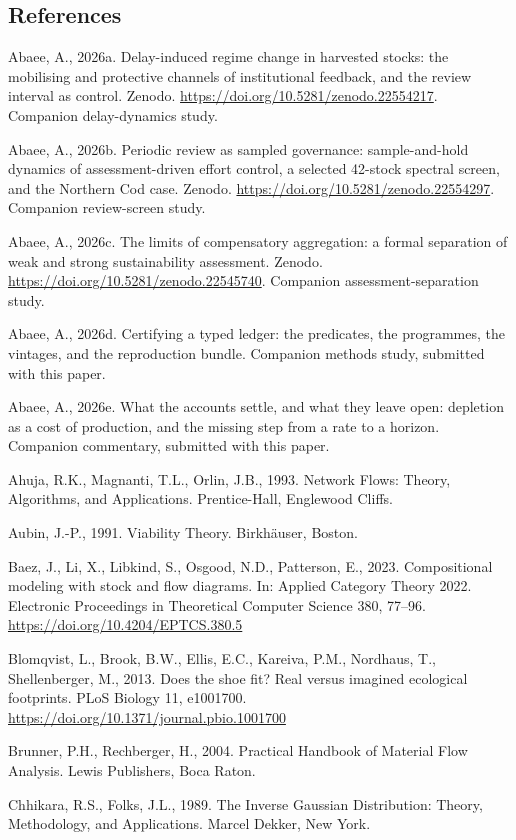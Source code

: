 \documentclass[11pt]{article}
\begin{document}
\subsection{References}\label{references}

Abaee, A., 2026a. Delay-induced regime change in harvested stocks: the
mobilising and protective channels of institutional feedback, and the
review interval as control. Zenodo.
\url{https://doi.org/10.5281/zenodo.22554217}. Companion delay-dynamics study.

Abaee, A., 2026b. Periodic review as sampled governance: sample-and-hold
dynamics of assessment-driven effort control, a selected 42-stock
spectral screen, and the Northern Cod case. Zenodo.
\url{https://doi.org/10.5281/zenodo.22554297}. Companion review-screen study.

Abaee, A., 2026c. The limits of compensatory aggregation: a formal separation of weak and strong sustainability assessment. Zenodo. \url{https://doi.org/10.5281/zenodo.22545740}. Companion assessment-separation study.

Abaee, A., 2026d. Certifying a typed ledger: the predicates, the programmes, the vintages, and the reproduction bundle. Companion methods study, submitted with this paper.

Abaee, A., 2026e. What the accounts settle, and what they leave open: depletion as a cost of production, and the missing step from a rate to a horizon. Companion commentary, submitted with this paper.

Ahuja, R.K., Magnanti, T.L., Orlin, J.B., 1993. Network Flows: Theory, Algorithms, and Applications. Prentice-Hall, Englewood Cliffs.

Aubin, J.-P., 1991. Viability Theory. Birkh\"auser, Boston.

Baez, J., Li, X., Libkind, S., Osgood, N.D., Patterson, E., 2023. Compositional modeling with stock and flow diagrams. In: Applied Category Theory 2022. Electronic Proceedings in Theoretical Computer Science 380, 77--96. \url{https://doi.org/10.4204/EPTCS.380.5}

Blomqvist, L., Brook, B.W., Ellis, E.C., Kareiva, P.M., Nordhaus, T.,
Shellenberger, M., 2013. Does the shoe fit? Real versus imagined
ecological footprints. PLoS Biology 11, e1001700.
\url{https://doi.org/10.1371/journal.pbio.1001700}

Brunner, P.H., Rechberger, H., 2004. Practical Handbook of Material Flow
Analysis. Lewis Publishers, Boca Raton.

Chhikara, R.S., Folks, J.L., 1989. The Inverse Gaussian Distribution:
Theory, Methodology, and Applications. Marcel Dekker, New York.
\end{document}
